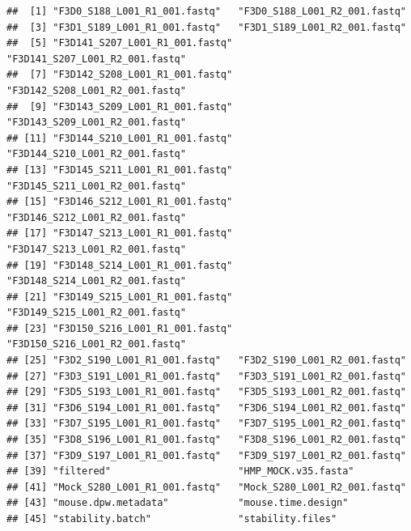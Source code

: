 \documentclass[
]{book}
\begin{document}
\begin{verbatim}
##  [1] "F3D0_S188_L001_R1_001.fastq"   "F3D0_S188_L001_R2_001.fastq"  
##  [3] "F3D1_S189_L001_R1_001.fastq"   "F3D1_S189_L001_R2_001.fastq"  
##  [5] "F3D141_S207_L001_R1_001.fastq" "F3D141_S207_L001_R2_001.fastq"
##  [7] "F3D142_S208_L001_R1_001.fastq" "F3D142_S208_L001_R2_001.fastq"
##  [9] "F3D143_S209_L001_R1_001.fastq" "F3D143_S209_L001_R2_001.fastq"
## [11] "F3D144_S210_L001_R1_001.fastq" "F3D144_S210_L001_R2_001.fastq"
## [13] "F3D145_S211_L001_R1_001.fastq" "F3D145_S211_L001_R2_001.fastq"
## [15] "F3D146_S212_L001_R1_001.fastq" "F3D146_S212_L001_R2_001.fastq"
## [17] "F3D147_S213_L001_R1_001.fastq" "F3D147_S213_L001_R2_001.fastq"
## [19] "F3D148_S214_L001_R1_001.fastq" "F3D148_S214_L001_R2_001.fastq"
## [21] "F3D149_S215_L001_R1_001.fastq" "F3D149_S215_L001_R2_001.fastq"
## [23] "F3D150_S216_L001_R1_001.fastq" "F3D150_S216_L001_R2_001.fastq"
## [25] "F3D2_S190_L001_R1_001.fastq"   "F3D2_S190_L001_R2_001.fastq"  
## [27] "F3D3_S191_L001_R1_001.fastq"   "F3D3_S191_L001_R2_001.fastq"  
## [29] "F3D5_S193_L001_R1_001.fastq"   "F3D5_S193_L001_R2_001.fastq"  
## [31] "F3D6_S194_L001_R1_001.fastq"   "F3D6_S194_L001_R2_001.fastq"  
## [33] "F3D7_S195_L001_R1_001.fastq"   "F3D7_S195_L001_R2_001.fastq"  
## [35] "F3D8_S196_L001_R1_001.fastq"   "F3D8_S196_L001_R2_001.fastq"  
## [37] "F3D9_S197_L001_R1_001.fastq"   "F3D9_S197_L001_R2_001.fastq"  
## [39] "filtered"                      "HMP_MOCK.v35.fasta"           
## [41] "Mock_S280_L001_R1_001.fastq"   "Mock_S280_L001_R2_001.fastq"  
## [43] "mouse.dpw.metadata"            "mouse.time.design"            
## [45] "stability.batch"               "stability.files"
\end{verbatim}
\end{document}
